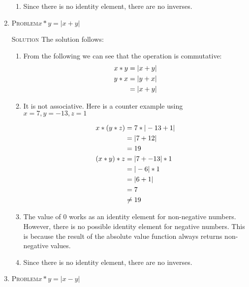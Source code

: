 \documentclass[draft,twoside]{amsart}
\newcommand{\Solution}{\textsc{Solution}\xspace}
\newcommand{\Problem}{\textsc{Problem}\xspace}
\begin{document}
\begin{enumerate}
\begin{enumerate}
      \item Since there is no identity element, there are no inverses.

   \end{enumerate}

   \item \Problem $x * y = | x + y |$

   \noindent \Solution The solution follows:

   \begin{enumerate}
      \item From the following we can see that the operation is commutative:
      \begin{align*}
         x * y & = | x + y |         \\
	 y * x & = | y + x |         \\
	       & = | x + y | \notag  
      \end{align*}

      \item It is not associative. Here is a counter example using
      $x = 7, y = -13, z = 1$

      \begin{align*}
         x * (y * z) & = 7 * | -13 + 1 | \\
	             & = | 7 + 12 | \notag \\
		     & = 19         \notag \\
	 (x * y) * z & = | 7 + -13 | * 1   \\
	             & = | -6 | * 1 \notag \\
		     & = | 6 + 1 |  \notag \\
		     & = 7          \notag \\
		     & \ne 19       \notag
      \end{align*}

      \item The value of $0$ works as an identity element for non-negative
         numbers. However, there is no possible identity element for negative
         numbers. This is because the result of the absolute value
	 function always returns non-negative values.

      \item Since there is no identity element, there are no inverses.

   \end{enumerate}


   \item \Problem $x * y = | x - y |$


\end{enumerate}
\end{document}
